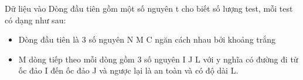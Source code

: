 Dữ liệu vào
Dòng đầu tiên gồm một số nguyên t cho biết số lượng test, mỗi test có dạng như sau:
\begin{itemize}
	\item Dòng đầu tiên là 3 số nguyên N M C ngăn cách nhau bởi khoảng trắng
	\item M dòng tiếp theo mỗi dòng gồm 3 số nguyên I J L với y nghĩa có đường đi từ ốc đảo I đến ốc đảo J và ngược lại là an toàn và có độ dài L.
\end{itemize}